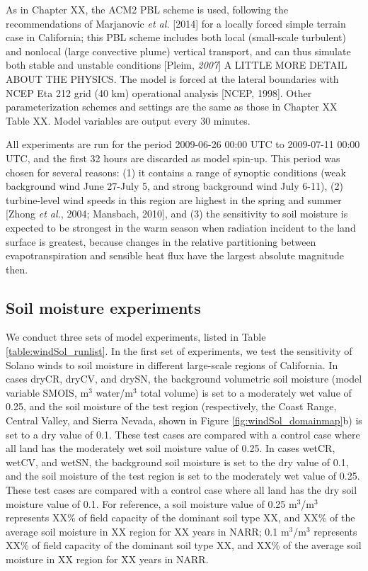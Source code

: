 As in Chapter XX, the ACM2 PBL scheme is used, following the recommendations of Marjanovic \textit{et al.} [2014] for a locally forced simple terrain case in California; this PBL scheme includes both local (small-scale turbulent) and nonlocal (large convective plume) vertical transport, and can thus simulate both stable and unstable conditions [Pleim, \textit{2007}] A LITTLE MORE DETAIL ABOUT THE PHYSICS.  The model is forced at the lateral boundaries with NCEP Eta 212 grid (40 km) operational analysis [NCEP, 1998].  Other parameterization schemes and settings are the same as those in Chapter XX Table XX.  Model variables are output every 30 minutes.

All experiments are run for the period 2009-06-26 00:00 UTC to 2009-07-11 00:00 UTC, and the first 32 hours are discarded as model spin-up.  This period was chosen for several reasons: (1) it contains a range of synoptic conditions (weak background wind June 27-July 5, and strong background wind July 6-11), (2) turbine-level wind speeds in this region are highest in the spring and summer [Zhong \textit{et al.}, 2004; Mansbach, 2010], and (3) the sensitivity to soil moisture is expected to be strongest in the warm season when radiation incident to the land surface is greatest, because changes in the relative partitioning between evapotranspiration and sensible heat flux have the largest absolute magnitude then.

\subsection{Soil moisture experiments}

We conduct three sets of model experiments, listed in Table \ref{table:windSol_runlist}.  In the first set of experiments, we test the sensitivity of Solano winds to soil moisture in different large-scale regions of California.  In cases dryCR, dryCV, and drySN, the background volumetric soil moisture (model variable SMOIS, m$^3$ water/m$^3$ total volume) is set to a moderately wet value of 0.25, and the soil moisture of the test region (respectively, the Coast Range, Central Valley, and Sierra Nevada, shown in Figure \ref{fig:windSol_domainmap}b) is set to a dry value of 0.1.  These test cases are compared with a control case where all land has the moderately wet soil moisture value of 0.25.  In cases wetCR, wetCV, and wetSN, the background soil moisture is set to the dry value of 0.1, and the soil moisture of the test region is set to the moderately wet value of 0.25.  These test cases are compared with a control case where all land has the dry soil moisture value of 0.1.  For reference, a soil moisture value of 0.25 m$^3$/m$^3$ represents XX\% of field capacity of the dominant soil type XX, and XX\% of the average soil moisture in XX region for XX years in NARR; 0.1 m$^3$/m$^3$ represents XX\% of field capacity of the dominant soil type XX, and XX\% of the average soil moisture in XX region for XX years in NARR.

